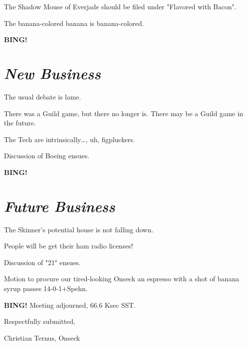 \documentclass[10pt]{article}
\newcommand{\bing}{{\bf BING!} }
\newcommand{\goto}[1]{\bing \vskip 12pt \section*{{\em{#1}}}}
\begin{document}
The Shadow Mouse of Everjade should be filed under "Flavored with Bacon".

The banana-colored banana is banana-colored.

\goto{New Business}

The usual debate is lame.

There was a Guild game, but there no longer is.  There may be a Guild game in the future.

The Tech are intrinsically\ldots{}, uh, figpluckers.

Discussion of Boeing ensues.

\goto{Future Business}

The Skinner's potential house is not falling down.

People will be get their ham radio licenses!

Discussion of "21" ensues.

Motion to procure our tired-looking Onseck an espresso with a shot of banana syrup passes 14-0-1+Spehn.

\bing
\noindent
Meeting adjourned, 66.6 Ksec SST.

\vspace{18pt}

\centerline{Respectfully submitted,}
\centerline{Christian Ternus, Onseck}
\end{document}
